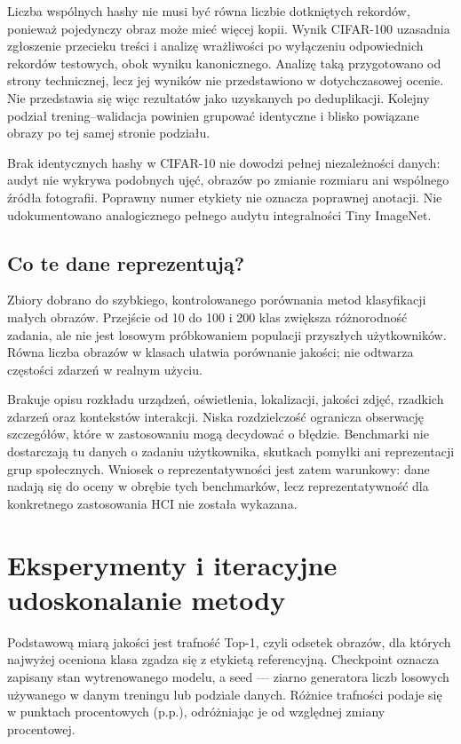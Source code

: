 \documentclass[12pt,a4paper]{article}
\newcommand{\pp}{p.p.}
\begin{document}
Liczba wspólnych hashy nie musi być równa liczbie dotkniętych rekordów,
ponieważ pojedynczy obraz może mieć więcej kopii. Wynik CIFAR-100 uzasadnia
zgłoszenie przecieku treści i analizę wrażliwości po wyłączeniu
odpowiednich rekordów testowych, obok wyniku kanonicznego. Analizę taką przygotowano od strony technicznej, lecz jej wyników
nie przedstawiono w dotychczasowej ocenie. Nie przedstawia się więc rezultatów jako uzyskanych po
deduplikacji. Kolejny podział trening--walidacja powinien grupować identyczne
i blisko powiązane obrazy po tej samej stronie podziału.

Brak identycznych hashy w CIFAR-10 nie dowodzi pełnej niezależności danych:
audyt nie wykrywa podobnych ujęć, obrazów po zmianie rozmiaru ani wspólnego
źródła fotografii. Poprawny numer etykiety nie oznacza poprawnej anotacji.
Nie udokumentowano analogicznego pełnego audytu integralności Tiny ImageNet.

\subsection{Co te dane reprezentują?}

Zbiory dobrano do szybkiego, kontrolowanego porównania metod klasyfikacji
małych obrazów. Przejście od 10 do 100 i 200 klas zwiększa różnorodność
zadania, ale nie jest losowym próbkowaniem populacji przyszłych użytkowników.
Równa liczba obrazów w klasach ułatwia porównanie jakości;
nie odtwarza częstości zdarzeń w realnym użyciu.

Brakuje opisu rozkładu urządzeń, oświetlenia, lokalizacji, jakości zdjęć,
rzadkich zdarzeń oraz kontekstów interakcji. Niska rozdzielczość ogranicza
obserwację szczegółów, które w zastosowaniu mogą decydować o błędzie.
Benchmarki nie dostarczają tu danych o zadaniu użytkownika, skutkach pomyłki
ani reprezentacji grup społecznych. Wniosek o reprezentatywności jest zatem
warunkowy: dane nadają się do oceny w obrębie tych benchmarków, lecz
reprezentatywność dla konkretnego zastosowania HCI nie została wykazana.

\section{Eksperymenty i iteracyjne udoskonalanie metody}

Podstawową miarą jakości jest trafność Top-1, czyli odsetek obrazów,
dla których najwyżej oceniona klasa zgadza się z etykietą referencyjną.
Checkpoint oznacza zapisany stan wytrenowanego modelu, a seed --- ziarno
generatora liczb losowych używanego w danym treningu lub podziale danych.
Różnice trafności podaje się w punktach procentowych (\pp), odróżniając
je od względnej zmiany procentowej.
\end{document}
